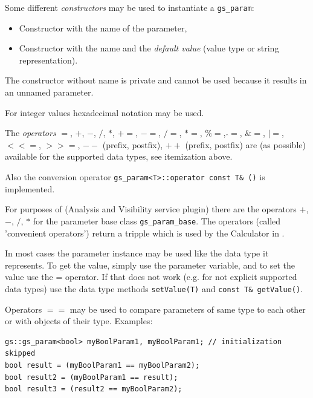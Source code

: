 Some different {\em constructors} may be used to instantiate a \lstinline|gs_param|:

\begin{itemize}
	\item Constructor with the name of the parameter,
	\item Constructor with the name and the {\em default value} (value type or string representation).
\end{itemize}

The constructor without name is private and cannot be used because it results in an unnamed parameter.

For integer values hexadecimal notation may be used.

The {\em operators} \colorbox{hellgrau}{$=$}, \colorbox{hellgrau}{$+$}, \colorbox{hellgrau}{$-$}, \colorbox{hellgrau}{$/$}, \colorbox{hellgrau}{$*$}, \colorbox{hellgrau}{$+=$}, \colorbox{hellgrau}{$-=$}, \colorbox{hellgrau}{$/=$}, \colorbox{hellgrau}{$*=$}, \colorbox{hellgrau}{$\%=$}, \colorbox{hellgrau}{$\hat{ }=$}, \colorbox{hellgrau}{$\&=$}, \colorbox{hellgrau}{$|=$}, \colorbox{hellgrau}{$<<=$}, \colorbox{hellgrau}{$>>=$}, \colorbox{hellgrau}{$--$} (prefix, postfix), \colorbox{hellgrau}{$++$} (prefix, postfix) are (as possible) available for the supported data types, see itemization above.

Also the conversion operator \lstinline|gs_param<T>::operator const T& ()| is implemented.

For purposes of \GreenAV (Analysis and Visibility service plugin) there are the operators \colorbox{hellgrau}{$+$}, \colorbox{hellgrau}{$-$}, \colorbox{hellgrau}{$/$}, \colorbox{hellgrau}{$*$} for the parameter base class \lstinline|gs_param_base|. The operators (called 'convenient operators') return a tripple which is used by the Calculator in \GreenAV.

In most cases the parameter instance may be used like the data type it represents. To get the value, simply use the parameter variable, and to set the value use the = operator. If that does not work (e.g. for not explicit supported data types) use the data type methods \lstinline|setValue(T)| and \lstinline|const T& getValue()|.

Operators \colorbox{hellgrau}{$==$} may be used to compare parameters of same type to each other or with objects of their type. Examples:
\begin{lstlisting}
gs::gs_param<bool> myBoolParam1, myBoolParam1; // initialization skipped
bool result = (myBoolParam1 == myBoolParam2);
bool result2 = (myBoolParam1 == result);
bool result3 = (result2 == myBoolParam2);
\end{lstlisting}


